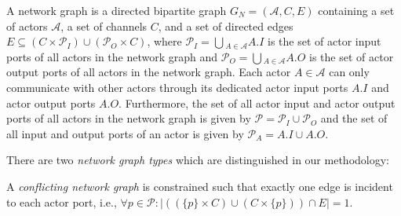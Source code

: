 \begin{definition}\label{network-graph}
A network graph is a directed bipartite graph $G_N=(\mathcal{A},C,E)$ containing
a set of actors $\mathcal{A}$, a set of channels $C$, and a set of
directed edges $E \subseteq (C \times \mathcal{P}_I)
\cup (\mathcal{P}_O \times C)$, where
$\mathcal{P}_I = \bigcup{}_{A \in \mathcal{A}} A.I$
is the set of actor input ports of all actors in the network graph and
$\mathcal{P}_O = \bigcup{}_{A \in \mathcal{A}} A.O$
is the set of actor output ports of all actors in the network graph.
Each actor $A \in \mathcal{A}$ can only communicate with other actors
through its dedicated actor input ports $A.I$ and
actor output ports $A.O$.
Furthermore, the set of all actor input and actor output ports of all actors in
the network graph is given by $\mathcal{P} = \mathcal{P}_I \cup \mathcal{P}_O$ and
the set of all input and output ports of an actor is given by $\mathcal{P}_{A} = A.I \cup A.O$.


\end{definition}

There are two \emph{network graph types} which are distinguished in our methodology:

\begin{definition}\label{conflicting-network-graph}
  A \emph{conflicting network graph} is constrained such that exactly
  one edge is incident to each actor port,
  i.e., $\forall{p \in \mathcal{P}}: |((\{p\} \times C) \cup (C \times \{p\})) \cap E| = 1$.
\end{definition}

